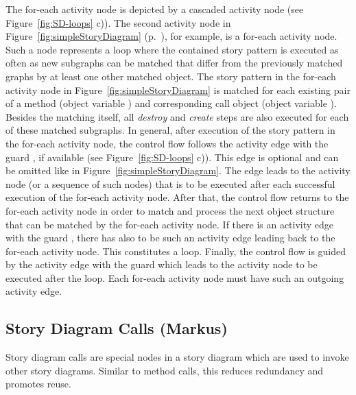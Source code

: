 The for-each activity node is depicted by a cascaded activity node (see Figure~\ref{fig:SD-loops} c)).
The second activity node in Figure~\ref{fig:simpleStoryDiagram} (p.~\pageref{fig:simpleStoryDiagram}), for example, is a for-each activity node.
Such a node represents a loop where the contained story pattern is executed as often as new subgraphs can be matched
that differ from the previously matched graphs by at least one other matched object.
The story pattern in the for-each activity node in Figure~\ref{fig:simpleStoryDiagram}
is matched for each existing pair of a method (object variable ) and corresponding call object (object variable ).
Besides the matching itself, all \emph{destroy} and \emph{create} steps are also executed for each of these matched subgraphs.
In general, after execution of the story pattern in the for-each activity node,
the control flow follows the activity edge with the guard , if available (see Figure~\ref{fig:SD-loops} c)).
This edge is optional and can be omitted like in Figure~\ref{fig:simpleStoryDiagram}.
The  edge leads to the activity node (or a sequence of such nodes)
that is to be executed after each successful execution of the for-each activity node.
After that, the control flow returns to the for-each activity node in order to match and process the next object structure that can be matched by the for-each activity node.
If there is an activity edge with the guard , there has also to be such an activity edge leading back to the for-each activity node.
This constitutes a loop.
Finally, the control flow is guided by the activity edge with the guard  which leads to the activity node to be executed after the loop.
Each for-each activity node must have such an outgoing  activity edge.



\subsection{Story Diagram Calls (Markus)}
\label{sec:Calls}
Story diagram calls are special nodes in a story diagram which are used to invoke other story diagrams. Similar to method calls, this reduces redundancy and promotes reuse.

